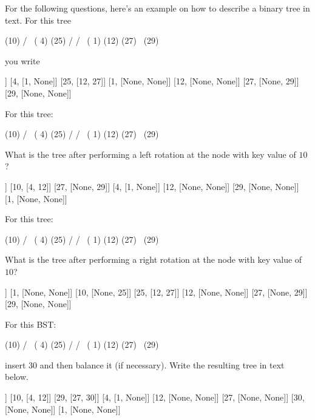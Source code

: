 

For the following questions,
here's an example on how to describe a binary tree in text.
For this tree
\begin{console}[fontsize=\footnotesize]
            (10)
          /      \
      ( 4)        (25)
     /           /    \
 ( 1)        (12)      (27)
                           \
                            (29)
\end{console}
you write
\begin{console}[fontsize=\footnotesize]
[10, [4, 25]]
[4, [1, None]]
[25, [12, 27]]
[1, [None, None]]
[12, [None, None]]
[27, [None, 29]]
[29, [None, None]]
\end{console}

\nextq
For this tree:
\begin{console}[fontsize=\footnotesize]
            (10)
          /      \
      ( 4)        (25)
     /           /    \
 ( 1)        (12)      (27)
                           \
                            (29)
\end{console}
What is the tree after performing a left rotation at the node
with key value of $10$?
\\
\ANSWER
\begin{answercode}
[25, [10, 27]]
[10, [4, 12]]
[27, [None, 29]]
[4, [1, None]]
[12, [None, None]]
[29, [None, None]]
[1, [None, None]]
\end{answercode}

\nextq
For this tree:
\begin{console}[fontsize=\footnotesize]
            (10)
          /      \
      ( 4)        (25)
     /           /    \
 ( 1)        (12)      (27)
                           \
                            (29)
\end{console}
What is the tree after performing a right rotation at the node
with key value of $10$?
\\
\ANSWER
\begin{answercode}
[4, [1, 10]]
[1, [None, None]]
[10, [None, 25]]
[25, [12, 27]]
[12, [None, None]]
[27, [None, 29]]
[29, [None, None]]
\end{answercode}

\nextq
For this BST:
\begin{console}[fontsize=\footnotesize]
            (10)
          /      \
      ( 4)        (25)
     /           /    \
 ( 1)        (12)      (27)
                           \
                            (29)
\end{console}
insert 30 and then balance it (if necessary).
Write the resulting tree in text below.
\ANSWER
\begin{answercode}
[25, [10, 29]]
[10, [4, 12]]
[29, [27, 30]]
[4, [1, None]]
[12, [None, None]]
[27, [None, None]]
[30, [None, None]]
[1, [None, None]]
\end{answercode}

